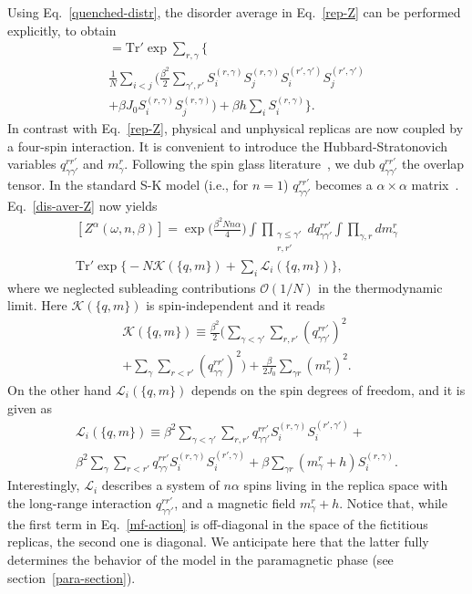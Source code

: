 \documentclass[twocolumn,superscriptaddress,prb,10pt]{revtex4-1}
\def\tr{\textrm{Tr}}
\begin{document}
Using Eq.~\eqref{quenched-distr}, the disorder average in Eq.~\eqref{rep-Z} 
can be performed explicitly, to obtain 
%
\begin{multline}
[Z^\alpha(\omega,n,\beta)]=\tr'\exp\sum\limits_{r,\gamma}\Big\{\\
\frac{1}{N}
\sum\limits_{i<j}\Big(
\frac{\beta^2}{2}\sum\limits_{\gamma',r'}S^{(r,\gamma)}_iS^{(r,\gamma)}_j
S^{(r',\gamma')}_iS^{(r',\gamma')}_j\\
+\beta J_0 S_i^{(r,\gamma)}S_j^{(r,\gamma)}\Big)
+\beta h\sum\limits_{i}
S_i^{(r,\gamma)}\Big\}.
\label{dis-aver-Z}
\end{multline}
%
In contrast with Eq.~\eqref{rep-Z}, physical and unphysical replicas are 
now coupled by a four-spin interaction. It is convenient to introduce the  
Hubbard-Stratonovich variables $q_{\gamma\gamma'}^{rr'}$ and $m_\gamma^r$. 
Following the spin glass literature~\cite{parisi-book}, we dub $q_{\gamma
\gamma'}^{rr'}$ the overlap tensor. In the standard S-K model (i.e., for $n=1$) 
$q_{\gamma\gamma'}^{rr'}$ becomes a $\alpha\times\alpha$ 
matrix~\cite{sherrington-1978-prl}. Eq.~\eqref{dis-aver-Z} now 
yields  
%
\begin{multline}
\label{hs-Z}
[Z^\alpha(\omega,n,\beta)]=\exp\Big(\frac{\beta^2Nn\alpha}{4}\Big)
\int\prod_{\substack{\gamma\le\gamma'\\r,r'}}
dq^{rr'}_{\gamma\gamma'}
\int\prod_{\gamma,r}dm_\gamma^r\\
\tr'\exp
\Big\{-N {\mathcal K}(\{q,m\})
+\sum_i{\mathcal L}_i(\{q,m\})\Big\},
\end{multline}
%
where we neglected subleading contributions ${\mathcal O}(1/N)$ in 
the thermodynamic limit. Here ${\mathcal K}(\{q,m\})$ is spin-independent 
and it reads 
%
\begin{multline}
{\mathcal K}(\{q,m\})\equiv 
\frac{\beta^2}{2}\Big(\sum\limits_{\gamma<\gamma'}\sum
\limits_{r,r'} (q_{\gamma\gamma'}^{rr'})^2
\\
+\sum\limits_{\gamma}\sum\limits_{r<r'}(q_{\gamma\gamma}^{
rr'})^2\Big)
+\frac{\beta}{2 J_0}\sum\limits_{\gamma r}(m_\gamma^r)^2. 
\label{Gamma}
\end{multline}
%
On the other hand ${\mathcal L}_i(\{q,m\})$ depends on the spin degrees of 
freedom, and it is given as   
%
\begin{multline}
{\mathcal L}_i(\{q,m\})
\equiv\beta^2\sum\limits_{\gamma<\gamma'}\sum\limits_{r,r'}
q_{\gamma\gamma'}^{rr'}S_i^{(r,\gamma)}
S_i^{(r',\gamma')}+\\
\beta^2\sum_\gamma\sum\limits_{r<r'}
q_{\gamma\gamma}^{rr'}S^{(r,\gamma)}_i
S^{(r',\gamma)}_i
+\beta\sum\limits_{\gamma r}(m_\gamma^r+h)
S_i^{(r,\gamma)}.
\label{mf-action}
\end{multline}
%
Interestingly, ${\mathcal L}_i$ describes a system of $n\alpha$ spins living 
in the replica space with the long-range interaction $q_{\gamma\gamma'}^{rr'}$, 
and a magnetic field $m_\gamma^r+h$. Notice that, while the first term in 
Eq.~\eqref{mf-action} is off-diagonal in the space of the fictitious replicas, 
the second one is diagonal. We anticipate here that the latter fully determines the 
behavior of the model in the paramagnetic phase (see section~\ref{para-section}). 
\end{document}
